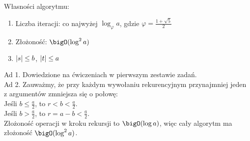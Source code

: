 Własności algorytmu:
\begin{enumerate}
    \item Liczba iteracji: co najwyżej \( \log_{\varphi} a \), gdzie \( \varphi = \frac{1 + \sqrt{5}}{2} \)
    \item Złożoność: \( \bigO(\log^2 a) \)
    \item \( \left\lvert s\right\rvert \leq b \), \( \left\lvert t\right\rvert \leq a \)
\end{enumerate}
Ad 1. Dowiedzione na ćwiczeniach w pierwszym zestawie zadań. \\
Ad 2. Zauważmy, że przy każdym wywołaniu rekurencyjnym przynajmniej jeden z argumentów zmniejsza się o połowę: \\
Jeśli \( b \leq \frac{a}{2} \), to \( r < b < \frac{a}{2} \). \\
Jeśli \( b > \frac{a}{2} \), to \( r = a - b < \frac{a}{2} \). \\
Złożoność operacji w kroku rekursji  to \( \bigO(\log a) \), więc cały algorytm ma złożoność \( \bigO(\log^2 a) \).
